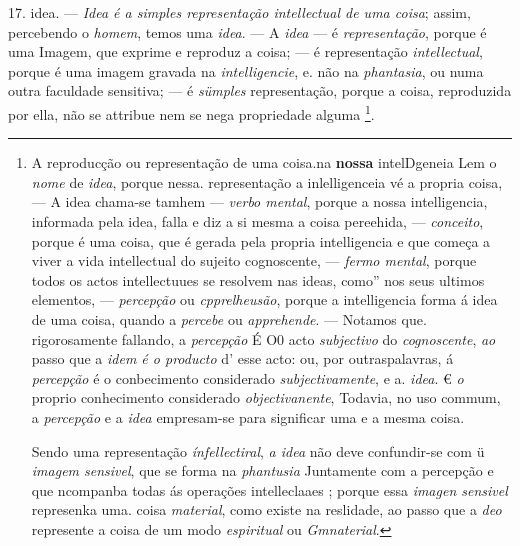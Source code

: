 17. idea. --- \emph{Idea é a simples representação intellectual de uma coisa}; assim, percebendo o \emph{homem}, temos uma \emph{idea}. --- A \emph{idea} --- é \emph{representação}, porque é uma Imagem, que exprime e reproduz a coisa; --- é representação \emph{intellectual}, porque é uma imagem gravada na \emph{intelligencie}, e. não na \emph{phantasia}, ou numa outra faculdade sensitiva; --- é \emph{sümples} representação, porque a coisa, reproduzida por ella, não se attribue nem se nega propriedade alguma \footnote{A reproducção ou representação de uma coisa.na \textbf{nossa} intelDgeneia Lem o \emph{nome} de \emph{idea}, porque nessa. representação a inlelligenceia vé a propria coisa, --- A idea chama-se tamhem --- \emph{verbo mental}, porque a nossa intelligencia, informada pela idea, falla e diz a si mesma a coisa pereehida, --- \emph{conceito}, porque é uma coisa, que é gerada pela propria intelligencia e que começa a viver a vida intellectual do sujeito cognoscente, --- \emph{fermo mental}, porque todos os actos intellectuues se resolvem nas ideas, como” nos seus ultimos elementos, --- \emph{percepção} ou \emph{cpprelheusão}, porque a intelligencia forma á idea de uma coisa, quando a \emph{percebe} ou \emph{apprehende}. --- Notamos que. rigorosamente fallando, a \emph{percepção} É O0 acto \emph{subjectivo} do \emph{cognoscente}, \emph{ao} passo que a \emph{idem é o producto} d' esse acto: ou, por outraspalavras, á \emph{percepção} é o conbecimento considerado \emph{subjectivamente}, e a. \emph{idea}. € \emph{o} proprio conhecimento considerado \emph{objectivanente}, Todavia, no uso commum, a \emph{percepção} e a \emph{idea} empresam-se para significar uma e a mesma coisa.\par Sendo uma representação \emph{ínfellectiral}, \emph{a idea} não deve confundir-se com ü \emph{imagem sensivel}, que se forma na \emph{phantusia} Juntamente com a percepção e que ncompanba todas ás operações intelleclaaes ; porque essa \emph{imagen sensivel} represenka uma. coisa \emph{material}, como existe na reslidade, ao passo que a \emph{deo} represente a coisa de um modo \emph{espiritual} ou \emph{Gmnaterial}.}.


